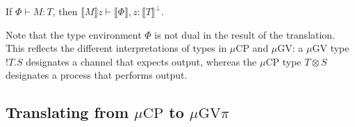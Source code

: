 \documentclass[orivec,envcountsame]{llncs}
\newcommand{\cpdual}[1]{#1^\perp}
\newcommand{\gvout}[2]{{!#1.#2}}
\newcommand{\lto}{\ensuremath{\multimap}}
\newcommand{\cptyp}[2]{#1 \vdash #2}
\newcommand{\gvtyp}[3]{#1 \vdash #2 : #3}
\newcommand{\mapname}{\mathsf{map}}
\newcommand{\map}[3]{\mapname^{#1}_{#2}(#3)}
\newcommand{\mkwd}[1]{\mathsf{#1}}
\newcommand{\link}[2]{#1 \leftrightarrow #2}
\newcommand{\cut}[4]{\mkwd{new}\:#1 \: (#3 \mid #4)}
\newcommand{\rec}[1]{\mkwd{rec}\:#1}
\newcommand{\corec}[4]{\mkwd{corec}\:{#1} \langle #2 \rangle (#3,#4)}
\newcommand{\tocpbig}[1]{\left\llbracket #1 \right\rrbracket}
\newcommand{\tocp}[1]{\llbracket #1 \rrbracket}
\newcommand{\mucp}{$\mu\mathrm{CP}$\xspace}
\newcommand{\mugv}{$\mu\mathrm{GV}$\xspace}
\newcommand{\gvpi}{$\mu\mathrm{GV}\pi$\xspace}
\begin{document}

%
%

\begin{theorem}
  If $\gvtyp{\Phi}{M}{T}$, then $\cptyp{\tocp{M}z}{\tocp{\Phi},z:\cpdual{\tocp{T}}}$.
\end{theorem}

Note that the type environment $\Phi$ is not dual in the result of the translation.  This reflects
the different interpretations of types in \mucp and \mugv: a \mugv type $\gvout{T}{S}$ designates a
channel that expects output, whereas the \mucp type $T \otimes S$ designates a process that performs
output.

\subsection{Translating from \mucp to \gvpi}\label{sec:cptogvpi}
\end{document}
